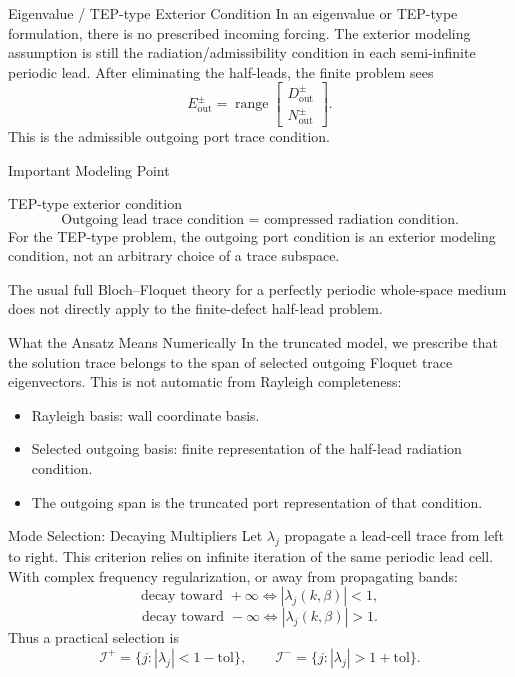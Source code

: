 \documentclass[aspectratio=169]{beamer}
\begin{document}
\begin{frame}{Eigenvalue / TEP-type Exterior Condition}
  In an eigenvalue or TEP-type formulation, there is no prescribed incoming forcing.
  The exterior modeling assumption is still the radiation/admissibility condition in each semi-infinite periodic lead.
  After eliminating the half-leads, the finite problem sees
  \[
    E_{\mathrm{out}}^\pm
    =
    \operatorname{range}
    \begin{bmatrix}
      D_{\mathrm{out}}^\pm\\
      N_{\mathrm{out}}^\pm
    \end{bmatrix}.
  \]
  This is the admissible outgoing port trace condition.
\end{frame}

\begin{frame}{Important Modeling Point}
  \begin{alertblock}{TEP-type exterior condition}
    \[
      \boxed{\text{Outgoing lead trace condition = compressed radiation condition.}}
    \]
    For the TEP-type problem, the outgoing port condition is an exterior modeling condition, not an arbitrary choice of a trace subspace.
  \end{alertblock}
  The usual full Bloch--Floquet theory for a perfectly periodic whole-space medium does not directly apply to the finite-defect half-lead problem.
\end{frame}

\begin{frame}{What the Ansatz Means Numerically}
  In the truncated model, we prescribe that the solution trace belongs to the span of selected outgoing Floquet trace eigenvectors.
  This is not automatic from Rayleigh completeness:
  \begin{itemize}
    \item Rayleigh basis: wall coordinate basis.
    \item Selected outgoing basis: finite representation of the half-lead radiation condition.
    \item The outgoing span is the truncated port representation of that condition.
  \end{itemize}
\end{frame}

\begin{frame}{Mode Selection: Decaying Multipliers}
  Let \(\lambda_j\) propagate a lead-cell trace from left to right.
  This criterion relies on infinite iteration of the same periodic lead cell.
  With complex frequency regularization, or away from propagating bands:
  \[
    \boxed{
    \text{decay toward }+\infty
    \iff
    |\lambda_j(k,\beta)|<1
    },
  \]
  \[
    \boxed{
    \text{decay toward }-\infty
    \iff
    |\lambda_j(k,\beta)|>1
    }.
  \]
  Thus a practical selection is
  \[
    \mathcal I^+=\{j:|\lambda_j|<1-\mathrm{tol}\},
    \qquad
    \mathcal I^-=\{j:|\lambda_j|>1+\mathrm{tol}\}.
  \]
\end{frame}
\end{document}
